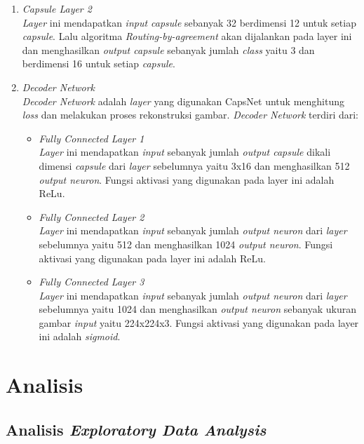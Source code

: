 \documentclass{article}
\begin{document}
\begin{enumerate}
		\item \textit{Capsule Layer 2}\\
		\textit{Layer} ini mendapatkan \textit{input capsule} sebanyak 32 berdimensi 12 untuk setiap \textit{capsule}. Lalu algoritma \textit{Routing-by-agreement} akan dijalankan pada layer ini dan menghasilkan \textit{output capsule} sebanyak jumlah \textit{class} yaitu 3 dan berdimensi 16 untuk setiap \textit{capsule}.
		
		\item \textit{Decoder Network}\\
		\textit{Decoder Network} adalah \textit{layer} yang digunakan CapsNet untuk menghitung \textit{loss} dan melakukan proses rekonstruksi gambar. \textit{Decoder Network} terdiri dari:
		\begin{itemize}
			\item \textit{Fully Connected Layer 1}\\
			\textit{Layer} ini mendapatkan \textit{input} sebanyak jumlah \textit{output capsule} dikali dimensi \textit{capsule} dari \textit{layer} sebelumnya yaitu 3x16 dan menghasilkan 512 \textit{output neuron}. Fungsi aktivasi yang digunakan pada layer ini adalah ReLu.
			
			\item \textit{Fully Connected Layer 2}\\
			\textit{Layer} ini mendapatkan \textit{input} sebanyak jumlah \textit{output neuron} dari \textit{layer} sebelumnya yaitu 512 dan menghasilkan 1024 \textit{output neuron}. Fungsi aktivasi yang digunakan pada layer ini adalah ReLu.
			
			\item \textit{Fully Connected Layer 3}\\
			\textit{Layer} ini mendapatkan \textit{input} sebanyak jumlah \textit{output neuron} dari \textit{layer} sebelumnya yaitu 1024 dan menghasilkan \textit{output neuron} sebanyak ukuran gambar \textit{input} yaitu 224x224x3. Fungsi aktivasi yang digunakan pada layer ini adalah \textit{sigmoid}.
		\end{itemize}
		
	\end{enumerate}
   \newpage
   \section{Analisis}
    \subsection{Analisis \textit{Exploratory Data Analysis}}
     	
\end{document}
